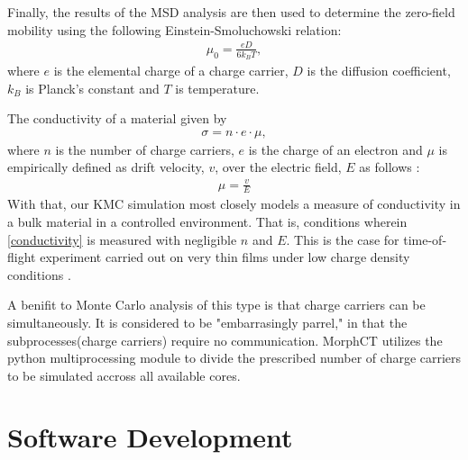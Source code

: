 Finally, the results of the MSD analysis are then used to determine the zero-field mobility using the following Einstein-Smoluchowski relation:
\begin{align}
    \label{einstein}
    \mu_{0} = \frac{eD}{6k_{B}T},
\end{align}
where $e$ is the elemental charge of a charge carrier, $D$ is the diffusion coefficient, $k_{B}$ is Planck's
constant and $T$ is temperature. 

The conductivity of a material given by 
\begin{align}
    \label{conductivity}
    \sigma = n \cdot e \cdot \mu,
\end{align}
where $n$ is the number of charge carriers, $e$ is the charge of an electron and $\mu$ is empirically
defined as drift velocity, $v$, over the electric field, $E$ as follows \cite{Kokil2012}:
\begin{align}
    \label{m}
    \mu = \frac{v}{E}
\end{align}
With that, our KMC simulation most closely models a measure of conductivity in a bulk material in a controlled
environment. That is, conditions wherein \autoref{conductivity} is measured with negligible $n$ and $E$.
This is the case for time-of-flight experiment carried out on very thin films under low charge density
conditions \cite{Chen2000a}.

A benifit to Monte Carlo analysis of this type is that charge carriers can be simultaneously. It is considered
to be "embarrasingly parrel," in that the subprocesses(charge carriers) require no communication.
MorphCT utilizes the python multiprocessing module to divide the prescribed number of charge carriers to be
simulated accross all available cores.

\section{Software Development}
\label{software-methods}


